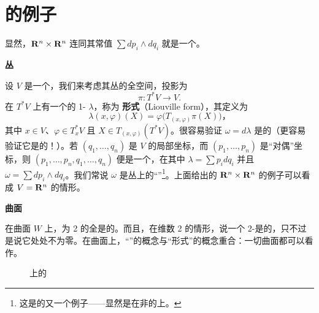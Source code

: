 
\section{\trSymplectic{}\trManifold{}的例子}
\label{sec:examples-symplectic-manifolds}

显然，$\mathbf{R}^n\times\mathbf{R}^n$ 连同其常值\trForm{} $\sum dp_i\wedge dq_i$ 就是一个\trSymplectic{}\trManifold。

\textbf{\trCotangent{}丛}

设 $V$ 是一个\trManifold，我们来考虑其\trCotangent{}丛的全空间，投影为
\[
\pi\colon T^*V\longrightarrow V.
\]
在 $T^*V$ 上有一个\trCanonical{}的\trDifferential{} 1-\trForm{} $\lambda$，称为 \textbf{\trLiouville{}形式}（Liouville form），其定义为
\[
\lambda(x,\varphi)(X)=\varphi\bigl(T_{(x,\varphi)}\pi(X)\bigr)\text{，}
\]
其中 $x\in V$、$\varphi\in T^*_xV$ 且 $X\in T_{(x,\varphi)}(T^*V)$。很容易验证 $\omega=d\lambda$ 是\trNondegenerate{}的（更容易验证它是\trClosed{}的！）。若 $(q_1,\dotsc,q_n)$ 是 $V$ 的局部坐标，而 $(p_1,\dotsc,p_n)$ 是“对偶”坐标，则 $(p_1,\dotsc,p_n,q_1,\dotsc,q_n)$ 便是一个\trChart，在其中 $\lambda=\sum p_idq_i$ 并且 $\omega=\sum dp_i\wedge dq_i$。我们常说 $\omega$ 是\trCotangent{}丛上的“\trCanonical\trSymplecticForm”\footnote{这是\trExact{}\trSymplecticForm{}的又一个例子——显然是在非\trCompact{}的\trManifold{}上。}。上面给出的 $\mathbf{R}^n\times\mathbf{R}^n$ 的例子可以看成 $V=\mathbf{R}^n$ 的情形。

\textbf{曲面}

在曲面 $W$ 上，\trDegree{}为 2 的\trDifferential\trForm{}全是\trClosed{}的。而且，在维数 2 的情形，说一个 2-\trForm{}是\trNondegenerate{}的，只不过是说它处处不为零。在曲面上，“\trSymplecticForm”的概念与“\trVolume{}形式”的概念重合：一切\trOrientable{}曲面都可以看作\trSymplectic{}\trManifold。

\begin{figure}[htbp]
\centering
{}
\caption{\trSphere{}上的\trSymplecticForm}
\label{fig:sphere-symplectic-form}
\end{figure}


